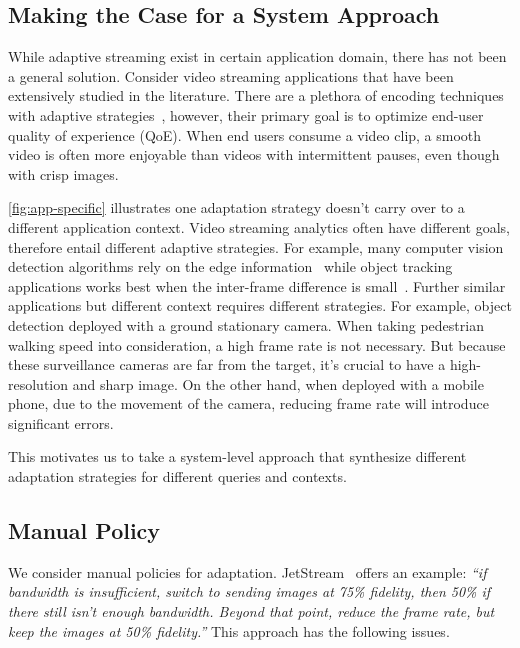 \subsection{Making the Case for a System Approach}
\label{sec:making-case-sys-approach}

While adaptive streaming exist in certain application domain, there has not been
a general solution. Consider video streaming applications that have been
extensively studied in the literature. There are a plethora of encoding
techniques~\cite{richardson2011h, grange2016vp9} with adaptive
strategies~\cite{yin2015control, michalos2012dynamic, pantos2016http}, however,
their primary goal is to optimize end-user quality of experience (QoE).  When
end users consume a video clip, a smooth video is often more enjoyable than
videos with intermittent pauses, even though with crisp images.

\autoref{fig:app-specific} illustrates one adaptation strategy doesn't carry
over to a different application context. Video streaming analytics often have
different goals, therefore entail different adaptive strategies. For example,
many computer vision detection algorithms rely on the edge
information~\cite{canny1986computational, lowe2004distinctive, viola2001rapid}
while object tracking applications works best when the inter-frame difference is
small~\cite{allen2004object}. Further similar applications but different context
requires different strategies. For example, object detection deployed with a
ground stationary camera. When taking pedestrian walking speed into
consideration, a high frame rate is not necessary. But because these
surveillance cameras are far from the target, it's crucial to have a
high-resolution and sharp image. On the other hand, when deployed with a mobile
phone, due to the movement of the camera, reducing frame rate will introduce
significant errors.

This motivates us to take a system-level approach that synthesize different
adaptation strategies for different queries and contexts.

\subsection{Manual Policy}
\label{sec:manual-policy}

We consider manual policies for
adaptation. JetStream~\cite{rabkin2014aggregation} offers an example:
\textit{``if bandwidth is insufficient, switch to sending images at 75\%
  fidelity, then 50\% if there still isn't enough bandwidth. Beyond that point,
  reduce the frame rate, but keep the images at 50\% fidelity.''} This approach
has the following issues.

